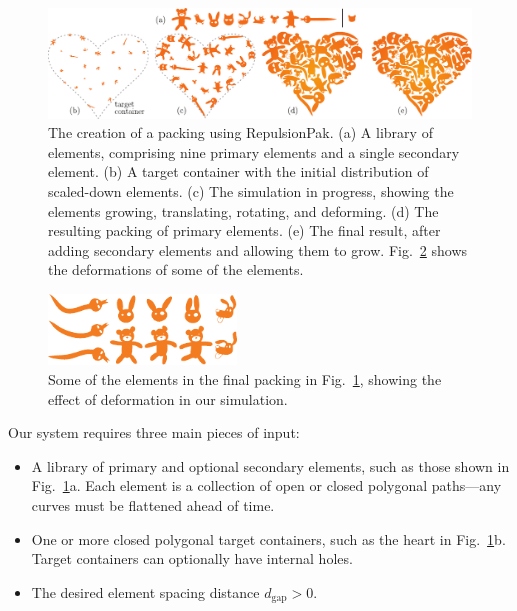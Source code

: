 \begin{figure}[h]
\centering
\includegraphics[width=1.0\textwidth]{figures/repulsionpak/pipeline.pdf} 
\caption[RepulsionPak pipeline]
{\label{fig_repulsionpak_pipeline} 
The creation of a packing using RepulsionPak.
  (a) A library of elements, comprising nine primary elements and a single
  	secondary element.
  (b) A target container with the initial distribution of scaled-down elements.
  (c) The simulation in progress, showing the elements growing, translating,
  	rotating, and deforming.
  (d) The resulting packing of primary elements.
  (e) The final result, after adding secondary elements and allowing them to
  	grow.
  	Fig.~\ref{fig_defviz} shows the deformations of some of the elements. }
\end{figure}

\begin{figure}[h]
\centering
\includegraphics[width=5cm]{figures/repulsionpak/pipeline_defviz_csk.pdf}
\caption[Element deformation]{
	\label{fig_defviz}
	Some of the elements in the final packing in Fig.~\ref{fig_repulsionpak_pipeline}, 
	showing the effect of deformation in our simulation.
}
\end{figure}

Our system requires three main pieces of input:
\begin{itemize}
	\item A library of primary and optional secondary elements, such
		as those shown in Fig.~\ref{fig_repulsionpak_pipeline}a.
	      Each element is a collection of 
		  open or closed polygonal paths---any curves must
		  be flattened ahead of time.
	\item One or more closed polygonal target containers, such as the
		heart in Fig.~\ref{fig_repulsionpak_pipeline}b.  Target containers can optionally
		have internal holes.
	\item The desired element spacing distance $d_\mathrm{gap}>0$.
\end{itemize}

